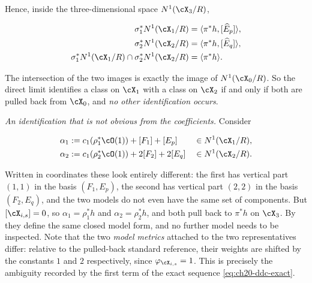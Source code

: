 \begin{example}
Hence, inside the three-dimensional space $N^1(\cX_3/R)$,

\begin{equation}
\label{eq:ch20-two-model-images}
 \begin{aligned}
 \sigma_1^*N^1(\cX_1/R)
   &=\langle\pi^*h,[\widehat E_p]\rangle,\\
 \sigma_2^*N^1(\cX_2/R)
   &=\langle\pi^*h,[\widehat E_q]\rangle,\\
 \sigma_1^*N^1(\cX_1/R)\cap\sigma_2^*N^1(\cX_2/R)
   &=\langle\pi^*h\rangle .
 \end{aligned}
\end{equation}

The intersection of the two images is exactly the image of
$N^1(\cX_0/R)$.  So the direct limit identifies a class on $\cX_1$ with
a class on $\cX_2$ if and only if both are pulled back from $\cX_0$,
and \emph{no other identification occurs}.

\emph{An identification that is not obvious from the coefficients.}
Consider

\[
\begin{aligned}
 \alpha_1&:=c_1(\rho_1^*\cO(1))+[F_1]+[E_p]&&\in N^1(\cX_1/R),\\
 \alpha_2&:=c_1(\rho_2^*\cO(1))+2[F_2]+2[E_q]&&\in N^1(\cX_2/R).
\end{aligned}
\]

Written in coordinates these look entirely different: the first has vertical
part $(1,1)$ in the basis $(F_1,E_p)$, the second has vertical part
$(2,2)$ in the basis $(F_2,E_q)$, and the two models do not even have
the same set of components.  But $[\cX_{i,s}]=0$, so
$\alpha_1=\rho_1^*h$ and $\alpha_2=\rho_2^*h$, and both pull back to
$\pi^*h$ on $\cX_3$.  By
 they define the same closed model
form, and no further model needs to be inspected.  Note that the two
\emph{model metrics} attached to the two representatives differ: relative
to the pulled-back standard reference, their weights are shifted by
the constants $1$ and $2$ respectively, since
$\varphi_{\cX_{i,s}}=1$.  This is precisely the ambiguity recorded by the
first term of the exact sequence \eqref{eq:ch20-ddc-exact}.


\end{example}
